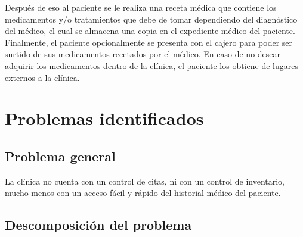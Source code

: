 Después de eso al paciente se le realiza una receta médica que contiene los medicamentos y/o tratamientos que debe de tomar dependiendo del diagnóstico del médico, el cual se almacena una copia en el expediente médico del paciente.\\ 

Finalmente, el paciente opcionalmente se presenta con el cajero para poder ser surtido de sus medicamentos recetados por el médico. En caso de no desear adquirir los medicamentos dentro de la clínica, el paciente los obtiene de lugares externos a la clínica.
\fi

\section{Problemas identificados}

\subsection{Problema general}

La clínica no cuenta con un control de citas, ni con un control de inventario, mucho menos con un acceso fácil y rápido del historial médico del paciente.

\subsection{Descomposición del problema}

